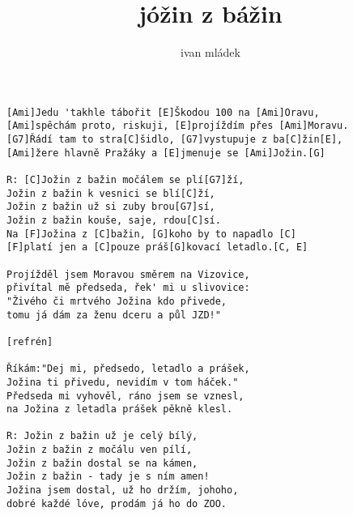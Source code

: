 \author{ivan mládek}
\title{jóžin z bážin}
\maketitle
\begin{verbatim}
[Ami]Jedu 'takhle tábořit [E]Škodou 100 na [Ami]Oravu,
[Ami]spěchám proto, riskuji, [E]projíždím přes [Ami]Moravu.
[G7]Řádí tam to stra[C]šidlo, [G7]vystupuje z ba[C]žin[E],
[Ami]žere hlavně Pražáky a [E]jmenuje se [Ami]Jožin.[G]

R: [C]Jožin z bažin močálem se plí[G7]ží,
Jožin z bažin k vesnici se blí[C]ží,
Jožin z bažin už si zuby brou[G7]sí,
Jožin z bažin kouše, saje, rdou[C]sí.
Na [F]Jožina z [C]bažin, [G]koho by to napadlo [C] 
[F]platí jen a [C]pouze práš[G]kovací letadlo.[C, E]

Projížděl jsem Moravou směrem na Vizovice,
přivítal mě předseda, řek' mi u slivovice:
"Živého či mrtvého Jožina kdo přivede,
tomu já dám za ženu dceru a půl JZD!"

[refrén]

Říkám:"Dej mi, předsedo, letadlo a prášek,
Jožina ti přivedu, nevidím v tom háček."
Předseda mi vyhověl, ráno jsem se vznesl,
na Jožina z letadla prášek pěkně klesl.

R: Jožin z bažin už je celý bílý,
Jožin z bažin z močálu ven pílí,
Jožin z bažin dostal se na kámen,
Jožin z bažin - tady je s ním amen!
Jožina jsem dostal, už ho držím, johoho,
dobré každé lóve, prodám já ho do ZOO.
\end{verbatim}